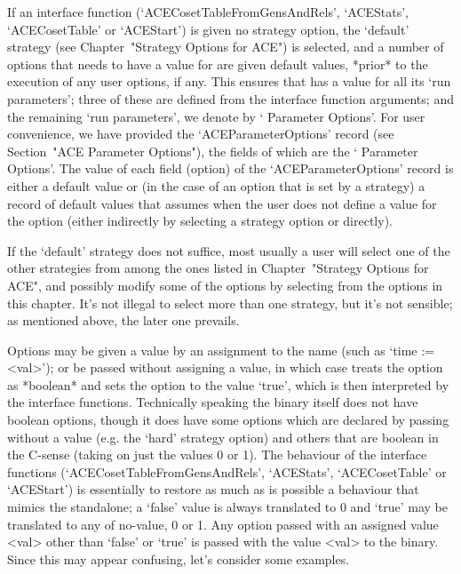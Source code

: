 If  an  {\ACE}  interface  function   (`ACECosetTableFromGensAndRels',
`ACEStats',  `ACECosetTable'  or  `ACEStart')  is  given  no  strategy
option, the `default'  strategy  (see  Chapter~"Strategy  Options  for
ACE") is selected, and a number of options that {\ACE} needs to have a
value for are given default values, *prior* to the  execution  of  any
user options, if any. This ensures that {\ACE} has a value for all its
\lq{}run parameters'; three of  these  are  defined  from  the  {\ACE}
interface function arguments; and the remaining \lq{}run  parameters',
we denote by \lq{}{\ACE} Parameter Options'. For user convenience,  we
have  provided  the  `ACEParameterOptions'  record  (see  Section~"ACE
Parameter Options"), the fields of which are the \lq{}{\ACE} Parameter
Options'.   The   value   of    each    field    (option)    of    the
`ACEParameterOptions' record is either a default value or (in the case
of an option that is set by a strategy) a  record  of  default  values
that {\ACE} assumes when the user does not  define  a  value  for  the
option (either indirectly by selecting a strategy option or directly).

If the `default' strategy does not suffice, most usually a  user  will
select one of the other strategies  from  among  the  ones  listed  in
Chapter~"Strategy Options for ACE", and possibly modify  some  of  the
options by selecting from  the  options  in  this  chapter.  It's  not
illegal to select more than one strategy, but it's  not  sensible;  as
mentioned above, the later one prevails.


Options may be given a value by an assignment to  the  name  (such  as
`time := <val>'); or be passed without assigning  a  value,  in  which
case {\GAP} treats the option as *boolean* and sets the option to  the
value `true', which  is  then  interpreted  by  the  {\ACE}  interface
functions. Technically speaking the {\ACE} binary itself does not have
boolean options, though it does have some options which  are  declared
by passing without a value  (e.g.  the  `hard'  strategy  option)  and
others that are boolean in the C-sense (taking on just the values 0 or
1).   The   behaviour    of    the    {\ACE}    interface    functions
(`ACECosetTableFromGensAndRels',   `ACEStats',   `ACECosetTable'    or
`ACEStart') is essentially  to  restore  as  much  as  is  possible  a
behaviour that mimics the {\ACE} standalone; a `false' value is always
translated to 0 and `true' may be translated to any of no-value, 0  or
1. Any option passed with an assigned value <val> other  than  `false'
or `true' is passed with the value <val> to the {\ACE}  binary.  Since
this may appear confusing, let's consider some examples.

